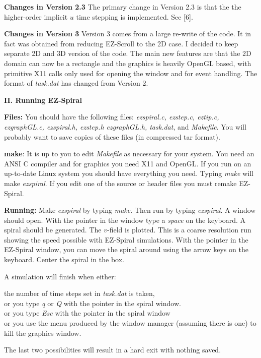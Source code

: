 \documentclass[12pt]{article}
\begin{document}
{\bf Changes in Version 2.3} The primary change in Version 2.3 is that
the the higher-order implicit $u$ time stepping is implemented.  See [6].

{\bf Changes in Version 3} Version 3 comes from a large re-write of the
code. It in fact was obtained from reducing EZ-Scroll to the 2D case. I
decided to keep separate 2D and 3D version of the code. The main new features
are that the 2D domain can now be a rectangle and the graphics is heavily
OpenGL based, with primitive X11 calls only used for opening the window and
for event handling. The format of {\em task.dat} has changed from Version 2.


\medskip
{\bf II. Running EZ-Spiral} 
\smallskip

{\bf Files:} You should have the following files: {\em ezspiral.c, ezstep.c,
eztip.c, ezgraphGL.c, ezspiral.h, ezstep.h ezgraphGL.h, task.dat}, and {\em
Makefile}. You will probably want to save copies of these files (in compressed
tar format).

{\bf make}: It is up to you to edit {\em Makefile} as necessary for your
system. You need an ANSI C compiler and for graphics you need X11 and
OpenGL. If you run on an up-to-date Linux system you should have everything
you need. Typing {\em make} will make {\em ezspiral}.  If you edit one of the
source or header files you must remake EZ-Spiral.

{\bf Running:} Make {\em ezspiral} by typing {\em make}. Then run by typing
{\em ezspiral}. A window should open. With the pointer in the window type a
{\em space} on the keyboard. A spiral should be generated.  The $v$-field is
plotted. This is a coarse resolution run showing the speed possible with
EZ-Spiral simulations.  With the pointer in the EZ-Spiral window, you can move
the spiral around using the arrow keys on the keyboard.  Center the spiral in
the box.

A simulation will finish when either:

\begin{list}{dummy}
{\partopsep=-10pt\parsep=-10pt\itemsep=0pt}
\item[~]the number of time steps set in {\em task.dat} is taken, \\
	or you type {\em q} or {\em Q} with the pointer in the spiral 
        window. \\
	or you type {\em Esc} with the pointer in the spiral window \\
	or you use the menu produced by the window manager (assuming there
        is one) to kill the graphics window.
\end{list}
The last two possibilities will result in a hard exit with nothing saved.
\end{document}
